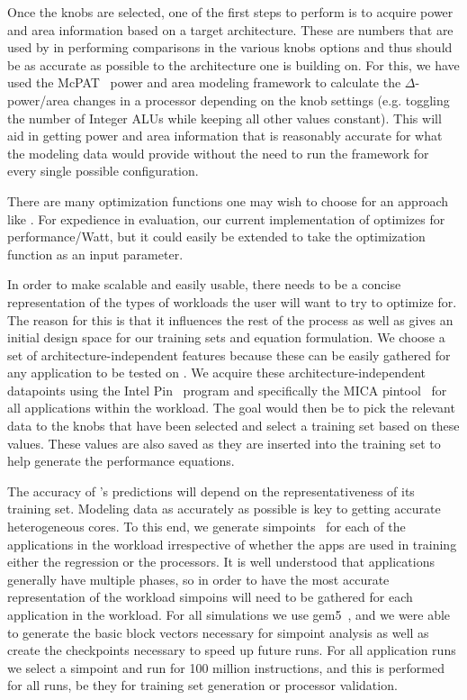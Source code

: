Once the knobs are selected, one of the first steps to perform is to
acquire power and area information based on a target
architecture. These are numbers that are used by \blackBox{} in
performing comparisons in the various knobs options and thus should be
as accurate as possible to the architecture one is building on. For
this, we have used the McPAT~\cite{mcpat} power and area modeling
framework to calculate the $\Delta$-power/area changes in a processor
depending on the knob settings (e.g. toggling the number of Integer
ALUs while keeping all other values constant). This will aid in
getting power and area information that is reasonably accurate for
what the modeling data would provide without the need to run the
framework for every single possible configuration.

 There are many
optimization functions one may wish to choose for an approach like
\blackBox{}. For expedience in evaluation, our current
implementation of \blackBox{} optimizes for performance/Watt, but it
could easily be extended to take the optimization function as an input
parameter.

 In order to make
\blackBox{} scalable and easily usable, there needs to be a concise
representation of the types of workloads the user will want to try to
optimize for. The reason for this is that it influences the rest
of the \blackBox{} process as well as gives an initial design space
for our training sets and equation formulation. We choose a set of
architecture-independent features because these can be easily gathered
for any application to be tested on \blackBox{}. We acquire these
architecture-independent datapoints using the Intel Pin~\cite{pin} program
and specifically the MICA pintool~\cite{Hoste07-IEEEMICRO-MICA} for all applications
within the workload. The goal would then be to pick the relevant data
to the knobs that have been selected and select a training set based
on these values. These values are also saved as they are inserted into
the training set to help generate the performance equations.

 The
accuracy of \blackBox{}'s predictions will depend on the
representativeness of its training set. 
Modeling data as accurately as possible is key to getting accurate
heterogeneous cores. To this end, we generate
simpoints~\cite{Sherwood01-PACT-Simpoint} for each of the applications
in the workload irrespective of whether the apps are used in training
either the regression or the processors. It is well understood that
applications generally have multiple phases, so in order to have the
most accurate representation of the workload simpoins will need to be
gathered for each application in the workload. For all
simulations we use gem5~\cite{gem5}, and we were able to generate the
basic block vectors necessary for simpoint analysis as well as create
the checkpoints necessary to speed up future runs. For all application
runs we select a simpoint and run for 100 million instructions, and
this is performed for all runs, be they for training set generation or
processor validation.

